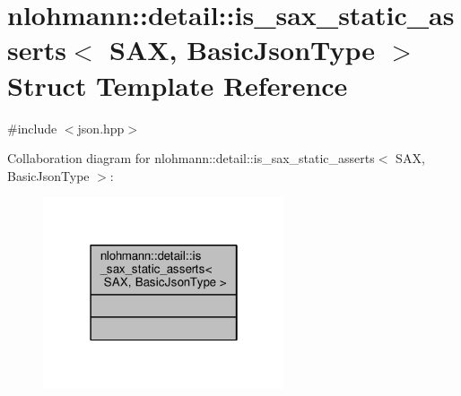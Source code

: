 \hypertarget{structnlohmann_1_1detail_1_1is__sax__static__asserts}{}\section{nlohmann\+:\+:detail\+:\+:is\+\_\+sax\+\_\+static\+\_\+asserts$<$ S\+AX, Basic\+Json\+Type $>$ Struct Template Reference}
\label{structnlohmann_1_1detail_1_1is__sax__static__asserts}


{\ttfamily \#include $<$json.\+hpp$>$}



Collaboration diagram for nlohmann\+:\+:detail\+:\+:is\+\_\+sax\+\_\+static\+\_\+asserts$<$ S\+AX, Basic\+Json\+Type $>$\+:
\nopagebreak
\begin{figure}[H]
\begin{center}
\leavevmode
\includegraphics[width=202pt]{structnlohmann_1_1detail_1_1is__sax__static__asserts__coll__graph}
\end{center}
\end{figure}
